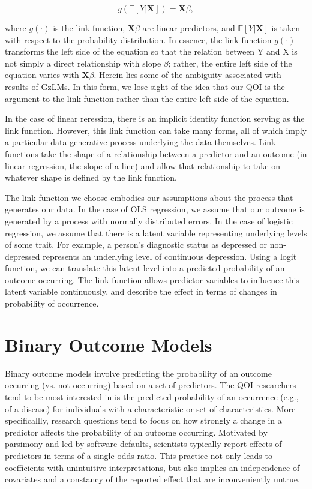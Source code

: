 \documentclass[jou, apacite]{apa6}
\begin{document}
\begin{equation}
g(\mathbb{E}[Y|\bm{X}]) = \bm{X} \beta ,
\end{equation}

where $g(\cdot)$ is the link function, $\bm{X}\beta$ are linear predictors, and $\mathbb{E}[Y|\bm{X}]$ is taken with respect to the probability distribution. In essence, the link function $g(\cdot)$ transforms the left side of the equation so that the relation between Y and X is not simply a direct relationship with slope $\beta$; rather, the entire left side of the equation varies with $\bm{X}\beta$.
Herein lies some of the ambiguity associated with results of GzLMs.
In this form, we lose sight of the idea that our QOI is the argument to the link function rather than the entire left side of the equation.

In the case of linear reression, there is an implicit identity function serving as the link function.
However, this link function can take many forms, all of which imply a particular data generative process underlying the data themselves.
Link functions take the shape of a relationship between a predictor and an outcome (in linear regression, the slope of a line) and allow that relationship to take on whatever shape is defined by the link function.

The link function we choose embodies our assumptions about the process that generates our data.
In the case of OLS regression, we assume that our outcome is generated by a process with normally distributed errors.
In the case of logistic regression, we assume that there is a latent variable representing underlying levels of some trait. 
For example, a person's diagnostic status as depressed or non-depressed represents an underlying level of continuous depression. 
Using a logit function, we can translate this latent level into a predicted probability of an outcome occurring.
The link function allows predictor variables to influence this latent variable continuously, and describe the effect in terms of changes in probability of occurrence.
\section{Binary Outcome Models}

Binary outcome models involve predicting the probability of an outcome occurring (vs. not occurring) based on a set of predictors. 
The QOI researchers tend to be most interested in is the predicted probability of an occurrence (e.g., of a disease) for individuals with a characteristic or set of characteristics.
More specificallly, research questions tend to focus on how strongly a change in a predictor affects the probability of an outcome occurring.
Motivated by parsimony and led by software defaults, scientists typically report effects of predictors in terms of a single odds ratio.
This practice not only leads to coefficients with unintuitive interpretations, but also implies an independence of covariates and a constancy of the reported effect that are inconveniently untrue.
\end{document}
